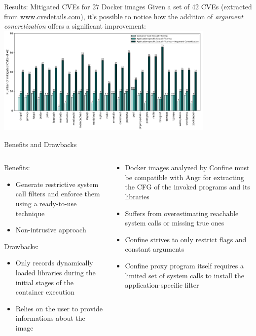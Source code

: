 \documentclass{beamer}
\begin{document}
\begin{frame}{Results: Mitigated CVEs for 27 Docker images}
Given a set of 42 CVEs (extracted from \url{www.cvedetails.com}), it's possible to notice how the addition of \textit{argument concretization} offers a significant improvement:
\hspace*{1cm}
\includegraphics[width=0.8\textwidth]
{assets/Confine/Confine-results.PNG}
\end{frame}

\begin{frame}{Benefits and Drawbacks}
\begin{columns}
\begin{column}{0.5\textwidth}
Benefits:
\begin{itemize}
    \item[\textcolor{newgreen}{\textbullet}] Generate restrictive system call filters and enforce them using a ready-to-use technique
    \item[\textcolor{newgreen}{\textbullet}] Non-intrusive approach
\end{itemize}
Drawbacks:
\begin{itemize}
    \item[\textcolor{newred}{\textbullet}] Only records dynamically loaded libraries during the initial stages of the container execution
    \item[\textcolor{newred}{\textbullet}] Relies on the user to provide informations about the image
\end{itemize}
\end{column}
\begin{column}{0.5\textwidth}
\begin{itemize}
    \item[\textcolor{newred}{\textbullet}] Docker images analyzed by Confine must be compatible with Angr for extracting the CFG of the invoked programs and its libraries
    \item[\textcolor{newred}{\textbullet}] Suffers from overestimating reachable system calls or missing true ones
    \item[\textcolor{newred}{\textbullet}] Confine strives to only restrict flags and constant arguments
    \item[\textcolor{newred}{\textbullet}] Confine proxy program itself requires a limited set of system calls to install the application-specific filter
\end{itemize}
\end{column}
\end{columns}
\end{frame}
\end{document}
